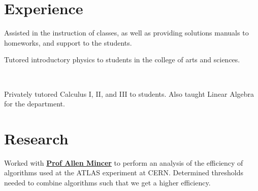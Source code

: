 \documentclass[]{deedy-resume-openfont}
\begin{document}
\begin{minipage}[t]{0.66\textwidth} 


\section{Experience}

\vspace{\topsep} %
\begin{tightemize}\item Assisted in the instruction of classes, as well as
        providing solutions manuals to homeworks, and support to the students.
\end{tightemize}
\sectionsep

\vspace{\topsep} %
\begin{tightemize}\item Tutored introductory physics to students in the college of arts
and sciences. 
\end{tightemize}
\sectionsep

\\
\begin{tightemize}
\item Privately tutored Calculus I, II, and III to students. Also taught Linear Algebra for the department. 
\end{tightemize}
\sectionsep


\section{Research}
Worked with \textbf{\href{https://as.nyu.edu/content/nyu-as/as/faculty/allen-mincer.html}{Prof Allen Mincer}} 
to perform an analysis of the efficiency of algorithms used at the ATLAS
experiment at CERN. 
Determined thresholds needed to combine algorithms such that we get a higher efficiency. 
\sectionsep


\end{minipage}
\end{document}

